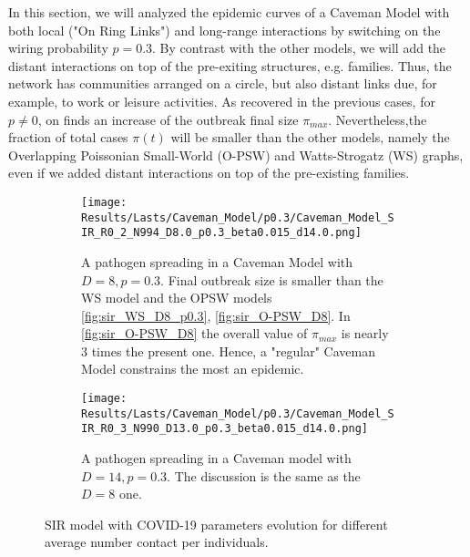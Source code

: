 \documentclass[a4paper,10pt, oneside]{book} %
\theoremstyle{definition}
\begin{document}
In this section, we will analyzed the epidemic curves of a Caveman Model with both local ("On Ring Links") and long-range interactions by switching on the wiring probability $p = 0.3$. By contrast with the other models, we will add the distant interactions on top of the pre-exiting structures, e.g. families. Thus, the network has communities arranged on a circle, but also distant links due, for example, to work or leisure activities.
As recovered in the previous cases, for $ p \neq 0$, on finds an increase of the outbreak final size $ \pi_{max} $. Nevertheless,the fraction of total cases $\pi(t)$ will be smaller than the other models, namely the Overlapping Poissonian Small-World (O-PSW) and Watts-Strogatz (WS) graphs, even if we added distant interactions on top of the pre-existing families.
\par\medskip
\begin{figure}[htbp]
	\centering
	\begin{subfigure}{0.9\linewidth}
		\texttt{[image: Results/Lasts/Caveman\_Model/p0.3/Caveman\_Model\_SIR\_R0\_2\_N994\_D8.0\_p0.3\_beta0.015\_d14.0.png]}
		\caption{A pathogen spreading in a Caveman Model with $D = 8, p = 0.3$. Final outbreak size is smaller than the WS model and the OPSW models \autoref{fig:sir_WS_D8_p0.3}, \autoref{fig:sir_O-PSW_D8}. In \autoref{fig:sir_O-PSW_D8} the overall value of $ \pi_{max}$ is nearly $3$ times the present one. Hence, a "regular" Caveman Model constrains the most an epidemic.}
		\label{fig:sir_CM_D8_p0.3}
	\end{subfigure}
	\par\bigskip
	\begin{subfigure}{0.9\linewidth}
		\texttt{[image: Results/Lasts/Caveman\_Model/p0.3/Caveman\_Model\_SIR\_R0\_3\_N990\_D13.0\_p0.3\_beta0.015\_d14.0.png]}
		\caption{A pathogen spreading in a Caveman model with $D = 14, p = 0.3$. The discussion is the same as the $ D = 8$ one.}
		\label{fig:sir_CM_D13_p0.3}
	\end{subfigure}
	\caption{SIR model with COVID-19 parameters evolution for different average number contact per individuals.}
	\label{fig:sir_CM_COVID_p0.3}
\end{figure}

\clearpage
\end{document}
